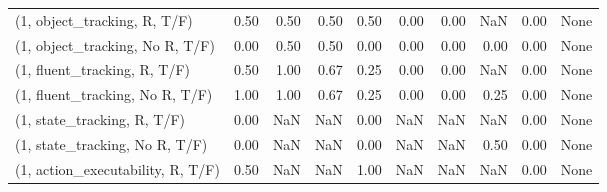 \begin{table*}[h!]
\begin{adjustbox}{width=2\columnwidth,center}
\begin{tabular}{lrrr|rrr|rrr}
\midrule
(1, object\_tracking, R, T/F)         &                      0.50 &                  0.50 &                      0.50 &                          0.50 &                      0.00 &                          0.00 &                                    NaN &                               0.00 &                                  None \\
(1, object\_tracking, No R, T/F)      &                      0.00 &                  0.50 &                      0.50 &                          0.00 &                      0.00 &                          0.00 &                                   0.00 &                               0.00 &                                  None \\
(1, fluent\_tracking, R, T/F)         &                      0.50 &                  1.00 &                      0.67 &                          0.25 &                      0.00 &                          0.00 &                                    NaN &                               0.00 &                                  None \\
(1, fluent\_tracking, No R, T/F)      &                      1.00 &                  1.00 &                      0.67 &                          0.25 &                      0.00 &                          0.00 &                                   0.25 &                               0.00 &                                  None \\
(1, state\_tracking, R, T/F)          &                      0.00 &                   NaN &                       NaN &                          0.00 &                       NaN &                           NaN &                                    NaN &                               0.00 &                                  None \\
(1, state\_tracking, No R, T/F)       &                      0.00 &                   NaN &                       NaN &                          0.00 &                       NaN &                           NaN &                                   0.50 &                               0.00 &                                  None \\
(1, action\_executability, R, T/F)    &                      0.50 &                   NaN &                       NaN &                          1.00 &                       NaN &                           NaN &                                    NaN &                               0.00 &                                  None \\

\end{tabular}
\end{adjustbox}
\end{table*}
